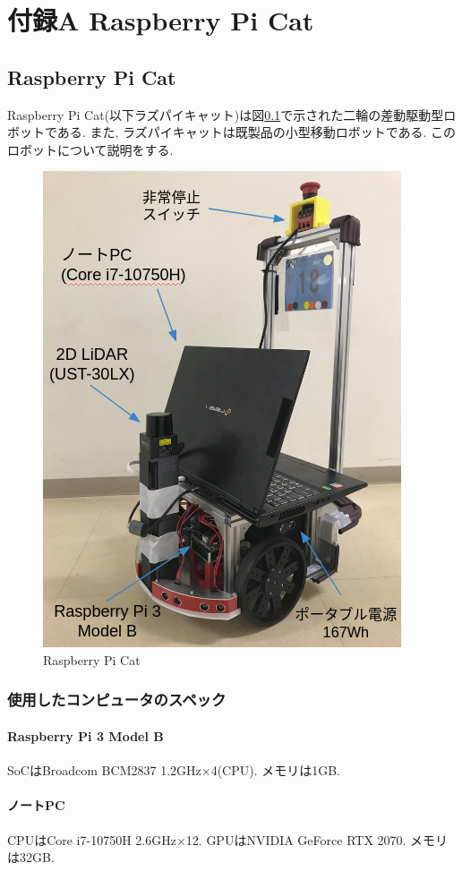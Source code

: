 \chapter*{付録A Raspberry Pi Cat}

\section{Raspberry Pi Cat}
Raspberry Pi Cat(以下ラズパイキャット)は図\ref{fig:raspicat}で示された二輪の差動駆動型ロボットである. 
また, ラズパイキャットは既製品の小型移動ロボットである.
このロボットについて説明をする.
\begin{figure}[h]
	\begin{center}
		\includegraphics[width=0.5\linewidth]{figs/raspicat.png}
		\caption{Raspberry Pi Cat}
		\label{fig:raspicat}
	\end{center}
\end{figure}

\subsection{使用したコンピュータのスペック}

\subsubsection{Raspberry Pi 3 Model B}
SoCはBroadcom BCM2837 1.2GHz×4(CPU).
メモリは1GB.
\subsubsection{ノートPC}
CPUはCore i7-10750H 2.6GHz×12. 
GPUはNVIDIA GeForce RTX 2070.
メモリは32GB.


